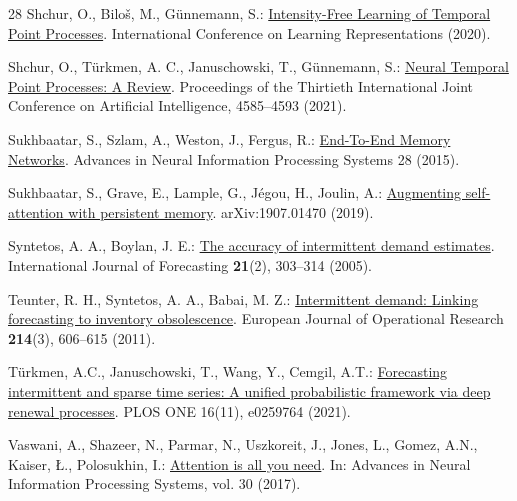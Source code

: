\documentclass[runningheads]{llncs}
\begin{document}
\begin{thebibliography}{28}
Shchur, O., Bilo\v{s}, M., G\"{u}nnemann, S.: \href{https://openreview.net/forum?id=HygOjhEYDH}{Intensity-Free Learning of Temporal Point Processes}. International Conference on Learning Representations (2020).

Shchur, O., T\"{u}rkmen, A. C., Januschowski, T., G\"{u}nnemann, S.: \href{https://www.ijcai.org/proceedings/2021/623}{Neural Temporal Point Processes: A Review}. Proceedings of the Thirtieth International Joint Conference on Artificial Intelligence, 4585--4593 (2021). 

Sukhbaatar, S., Szlam, A., Weston, J., Fergus, R.: \href{https://proceedings.neurips.cc/paper/2015/hash/8fb21ee7a2207526da55a679f0332de2-Abstract.html}{End-To-End Memory Networks}. Advances in Neural Information Processing Systems 28 (2015).

Sukhbaatar, S., Grave, E., Lample, G., J\'egou, H., Joulin, A.:
\href{https://arxiv.org/abs/1907.01470}{Augmenting self-attention with persistent memory}. arXiv:1907.01470 (2019).

Syntetos, A. A., Boylan, J. E.: \href{https://www.sciencedirect.com/science/article/pii/S0169207004000792}{The accuracy of intermittent demand estimates}. International Journal of Forecasting \textbf{21}(2), 303--314 (2005). 

Teunter, R. H., Syntetos, A. A., Babai, M. Z.: \href{https://www.sciencedirect.com/science/article/pii/S0377221711004437}{Intermittent demand: Linking forecasting to inventory obsolescence}. European Journal of Operational Research \textbf{214}(3), 606--615 (2011). 

T\"urkmen, A.C., Januschowski, T., Wang, Y., Cemgil, A.T.:
\href{https://doi.org/10.1371/journal.pone.0259764}{Forecasting intermittent and sparse time series: A unified probabilistic framework via deep renewal processes}. PLOS ONE 16(11), e0259764 (2021). 

Vaswani, A., Shazeer, N., Parmar, N., Uszkoreit, J., Jones, L., Gomez, A.N., Kaiser, \L{}., Polosukhin, I.:
\href{https://arxiv.org/abs/1706.03762}{Attention is all you need}. In: Advances in Neural Information Processing Systems, vol. 30 (2017).


\end{thebibliography}
\end{document}
